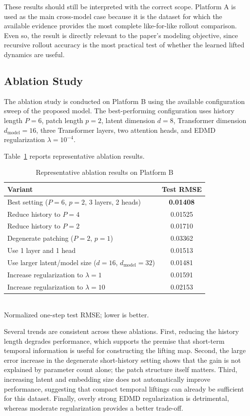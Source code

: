 \documentclass[journal]{IEEEtran}
\begin{document}
These results should still be interpreted with the correct scope. Platform A is used as the main cross-model case because it is the dataset for which the available evidence provides the most complete like-for-like rollout comparison. Even so, the result is directly relevant to the paper's modeling objective, since recursive rollout accuracy is the most practical test of whether the learned lifted dynamics are useful.

\subsection{Ablation Study}

The ablation study is conducted on Platform B using the available configuration sweep of the proposed model. The best-performing configuration uses history length $P=6$, patch length $p=2$, latent dimension $d=8$, Transformer dimension $d_{\mathrm{model}}=16$, three Transformer layers, two attention heads, and EDMD regularization $\lambda=10^{-4}$.

Table~\ref{tab:ablation_platform_b} reports representative ablation results.

\begin{table}[!t]
\renewcommand{\arraystretch}{1.2}
\caption{Representative ablation results on Platform B}
\label{tab:ablation_platform_b}
\centering
\begin{tabular}{>{\raggedright\arraybackslash}p{}c}
\hline\hline
Variant & Test RMSE \\
\hline
Best setting ($P=6$, $p=2$, 3 layers, 2 heads) & \textbf{0.01408} \\
Reduce history to $P=4$ & 0.01525 \\
Reduce history to $P=2$ & 0.01710 \\
Degenerate patching ($P=2$, $p=1$) & 0.03362 \\
Use 1 layer and 1 head & 0.01513 \\
Use larger latent/model size ($d=16$, $d_{\mathrm{model}}=32$) & 0.01481 \\
Increase regularization to $\lambda=1$ & 0.01591 \\
Increase regularization to $\lambda=10$ & 0.02153 \\
\hline\hline
\end{tabular}
\\[2pt]
{\footnotesize Normalized one-step test RMSE; lower is better.}
\end{table}

Several trends are consistent across these ablations. First, reducing the history length degrades performance, which supports the premise that short-term temporal information is useful for constructing the lifting map. Second, the large error increase in the degenerate short-history setting shows that the gain is not explained by parameter count alone; the patch structure itself matters. Third, increasing latent and embedding size does not automatically improve performance, suggesting that compact temporal liftings can already be sufficient for this dataset. Finally, overly strong EDMD regularization is detrimental, whereas moderate regularization provides a better trade-off.
\end{document}
